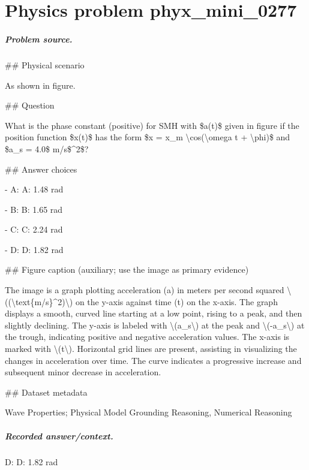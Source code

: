 
\chapter{Physics problem phyx\_mini\_0277}
\label{ch:PhyXMiniProblems_problem_phyx_mini_0277}

\paragraph{Problem source.}
\#\# Physical scenario

As shown in figure.

\#\# Question

What is the phase constant (positive) for SMH with \$a(t)\$ given in figure if the position function \$x(t)\$ has the form \$x = x\_m \textbackslash{}cos(\textbackslash{}omega t + \textbackslash{}phi)\$ and \$a\_s = 4.0\$ m/s\$\textasciicircum{}2\$?

\#\# Answer choices

- A: A: 1.48 rad

- B: B: 1.65 rad

- C: C: 2.24 rad

- D: D: 1.82 rad

\#\# Figure caption (auxiliary; use the image as primary evidence)

The image is a graph plotting acceleration (a) in meters per second squared \textbackslash{}((\textbackslash{}text\{m/s\}\textasciicircum{}2)\textbackslash{}) on the y-axis against time (t) on the x-axis. The graph displays a smooth, curved line starting at a low point, rising to a peak, and then slightly declining. The y-axis is labeled with \textbackslash{}(a\_s\textbackslash{}) at the peak and \textbackslash{}(-a\_s\textbackslash{}) at the trough, indicating positive and negative acceleration values. The x-axis is marked with \textbackslash{}(t\textbackslash{}). Horizontal grid lines are present, assisting in visualizing the changes in acceleration over time. The curve indicates a progressive increase and subsequent minor decrease in acceleration.

\#\# Dataset metadata

Wave Properties; Physical Model Grounding Reasoning, Numerical Reasoning

\paragraph{Recorded answer/context.}
D: D: 1.82 rad

